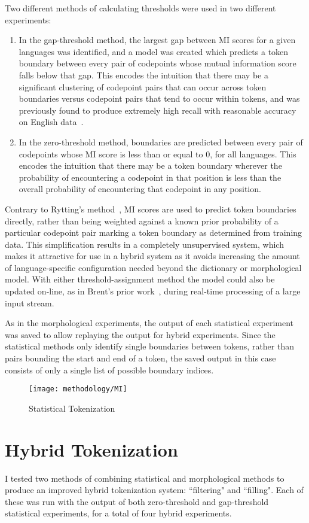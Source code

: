 Two different methods of calculating thresholds were used in two different experiments:
\begin{enumerate}
	\item In the gap-threshold method, the largest gap between MI scores for a given languages was identified, and a model was created which predicts a token boundary between every pair of codepoints whose mutual information score falls below that gap. This encodes the intuition that there may be a significant clustering of codepoint pairs that can occur across token boundaries versus codepoint pairs that tend to occur within tokens, and was previously found to produce extremely high recall with reasonable accuracy on English data~\cite{kearsley14}.
	\item In the zero-threshold method, boundaries are predicted between every pair of codepoints whose MI score is less than or equal to 0, for all languages. This encodes the intuition that there may be a token boundary wherever the probability of encountering a codepoint in that position is less than the overall probability of encountering that codepoint in any position.
\end{enumerate}
Contrary to Rytting's method~\cite{rytting04}, MI scores are used to predict token boundaries directly, rather than being weighted against a known prior probability of a particular codepoint pair marking a token boundary as determined from training data. This simplification results in a completely unsupervised system, which makes it attractive for use in a hybrid system as it avoids increasing the amount of language-specific configuration needed beyond the dictionary or morphological model. With either threshold-assignment method the model could also be updated on-line, as in Brent's prior work~\cite{brent99}, during real-time processing of a large input stream.

As in the morphological experiments, the output of each statistical experiment was saved to allow replaying the output for hybrid experiments. Since the statistical methods only identify single boundaries between tokens, rather than pairs bounding the start and end of a token, the saved output in this case consists of only a single list of possible boundary indices.

\begin{figure}
	\texttt{[image: methodology/MI]}
	\caption{Statistical Tokenization}
	\label{statdiagram}
\end{figure}

\section{Hybrid Tokenization}
I tested two methods of combining statistical and morphological methods to produce an improved hybrid tokenization system: ``filtering" and ``filling". Each of these was run with the output of both zero-threshold and gap-threshold statistical experiments, for a total of four hybrid experiments.

